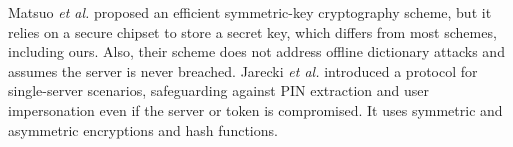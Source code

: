 %
%



Matsuo \textit{et al.} \cite{MatsuoMY11} proposed an efficient symmetric-key cryptography scheme, but it relies on a secure chipset to store a secret key, which differs from most schemes, including ours. Also, their scheme does not address offline dictionary attacks and assumes the server is never breached. 
%
Jarecki \textit{et al.} \cite{JareckiJKSS21} introduced a protocol for single-server scenarios, safeguarding against PIN extraction and user impersonation even if the server or token is compromised. It uses symmetric and asymmetric encryptions and  hash functions.


